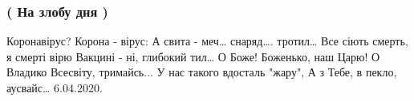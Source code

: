  
 
 

\subsubsection{( На злобу дня )}

Коронавірус? Корона - вірус:
А свита - меч… снаряд…. тротил…
Все сіють смерть, я смерті вірю
Вакцині - ні, глибокий тил…
О Боже! Боженько, наш Царю! О
Владико Всесвіту, тримайсь...
У нас такого вдосталь "жару",
А з Тебе, в пекло, аусвайс…
6.04.2020. 
